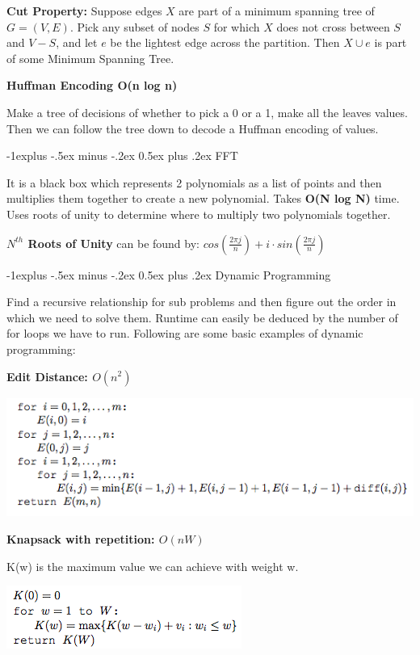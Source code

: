 \documentclass[landscape]{article}
\makeatletter
\renewcommand{\subsection}{\@startsection{subsection}{2}{0mm}%
                            {-1explus -.5ex minus -.2ex}%
                            {0.5ex plus .2ex}%
                            {\normalfont\normalsize\bfseries}}
\makeatother
\begin{document}
\begin{multicols}{3}
\textbf{Cut Property:}
Suppose edges $X$ are part of a minimum spanning tree of
$G = (V, E)$. Pick any subset of nodes $S$ for which $X$ does not
cross between $S$ and $V-S$, and let $e$ be the lightest edge across the
partition. Then $X \cup e$ is part of some Minimum Spanning Tree.



\textbf{Huffman Encoding O(n log n) }

Make a tree of decisions of whether to pick a 0 or a 1, make all the leaves values.
Then we can follow the tree down to decode a Huffman encoding of values.

\subsection{FFT}

It is a black box which represents 2 polynomials as a list of points and then multiplies them together to create a new polynomial. Takes \textbf{O(N log N)} time. Uses roots of unity to determine where to multiply two polynomials together.

\textbf{$N^{th}$ Roots of Unity} can be found by: $ cos(\frac{2\pi j}{n}) + i \cdot sin(\frac{2\pi j}{n})$

\subsection{Dynamic Programming}

Find a recursive relationship for sub problems and then figure out the order in which we need to solve them.
Runtime can easily be deduced by the number of for loops we have to run.
Following are some basic examples of dynamic programming:

\textbf{Edit Distance: $O(n^2)$}

\includegraphics[scale=0.42]{edit}

\textbf{Knapsack with repetition: $O(nW)$}

K(w) is the maximum value we can achieve with weight w.

\includegraphics[scale=0.5]{knapNR}


\end{multicols}
\end{document}
